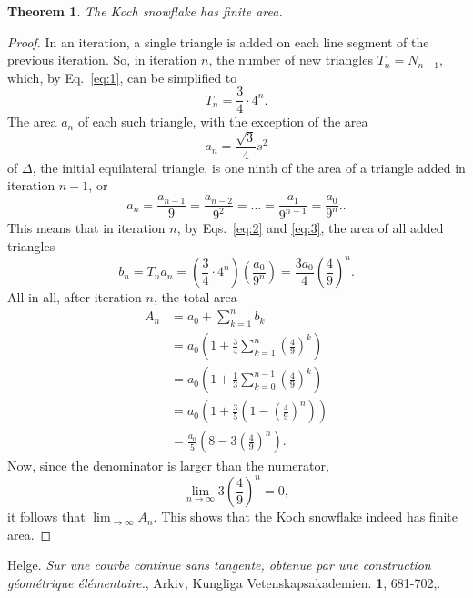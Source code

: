 \documentclass[12pt,a4paper]{article}
\newtheorem{theorem}{Theorem}
\begin{document}
\begin{theorem}
	The Koch snowflake has finite area.
\end{theorem}
\begin{proof}  
  In an iteration, a single triangle is added on each line segment of the previous iteration. So, in iteration $n$, the number of new triangles $T_n = N_{n-1}$, which, by Eq.~\ref{eq:1}, can be simplified to 
	\begin{equation}
		\label{eq:2}
		T_n = \frac{3}{4} \cdot 4^n.
	\end{equation}
	The area $a_n$ of each such triangle, with the exception of the area
	\begin{displaymath}
		a_n = \frac{\sqrt{3}}{4}s^2
	\end{displaymath}
	of $\Delta$, the initial equilateral triangle, is one ninth of the area of a triangle added in iteration $n - 1$, or 
	\begin{equation}
    	\label{eq:3}
    	a_n = \frac{a_{n-1}}{9} = \frac{a_{n-2}}{9^2} =  \ldots = \frac{a_1}{9^{n-1}} = \frac{a_0}{9^n}..
    \end{equation}
    This means that in iteration $n$, by Eqs.~\ref{eq:2} and \ref{eq:3}, the area of all added triangles
    \begin{equation}
    	b_n = T_na_n = \left(\frac{3}{4} \cdot 4^n \right) \left(\frac{a_0}{9^n}\right)  = \frac{3a_0}{4} \left(\frac{4}{9}\right)^n.
    \end{equation}
    All in all, after iteration $n$, the total area
    \begin{align*}
    	A_n &= a_0 + \sum_{k=1}^nb_k \\
    	&= a_0\left(1 + \frac{3}{4}\sum_{k=1}^n\left(\frac{4}{9}\right)^k\right) \\
    	&= a_0\left(1 + \frac{1}{3}\sum_{k=0}^{n-1}\left(\frac{4}{9}\right)^k\right) \\
    	&= a_0\left(1 + \frac{3}{5}\left(1 - \left(\frac{4}{9}\right)^n\right)\right) \\
    	&= \frac{a_0}{5}\left(8 - 3\left(\frac{4}{9}\right)^n\right).
    \end{align*}
    Now, since the denominator is larger than the numerator,
    \begin{displaymath}
    	\lim_{n\to\infty} 3\left(\frac{4}{9}\right)^n = 0,
    \end{displaymath}
    it follows that $\lim_{\to \infty} A_n$. This shows that the Koch snowflake indeed has finite area.  
\end{proof}


\begin{thebibliography}{99}
   Helge. \emph{Sur une courbe continue sans
      tangente, obtenue par une construction géométrique
      élémentaire.}, Arkiv,
    Kungliga Vetenskapsakademien. \textbf{1}, 681-702,.
\end{thebibliography}
\end{document}
